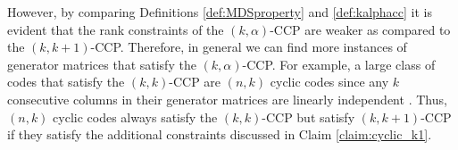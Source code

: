 \documentclass[journal,twocolumn]{IEEEtran}
\theoremstyle{definition}
\newtheorem{claim}{Claim}
\newtheorem{remark}{Remark}
\newcommand{\calS}{\mathcal{S}}
\newcommand{\calT}{\mathcal{T}}
\newcommand{\bfG}{\mathbf{G}}
\newcommand{\bfI}{\mathbf{I}}
\newcommand{\bfA}{\mathbf{A}}
\begin{document}
However, by comparing Definitions \ref{def:MDSproperty} and \ref{def:kalphacc} it is evident that the rank constraints of the $(k,\alpha)$-CCP are weaker as compared to the $(k,k+1)$-CCP. Therefore, in general we can find more instances of generator matrices that satisfy the $(k,\alpha)$-CCP. For example, a large class of codes that satisfy the $(k,k)$-CCP are $(n,k)$ cyclic codes since any $k$ consecutive columns in their generator matrices are linearly independent \cite{lincostello}. Thus, $(n,k)$ cyclic codes always satisfy the $(k,k)$-CCP but satisfy $(k,k+1)$-CCP if they satisfy the additional constraints discussed in Claim \ref{claim:cyclic_k1}.

%
\end{document}

